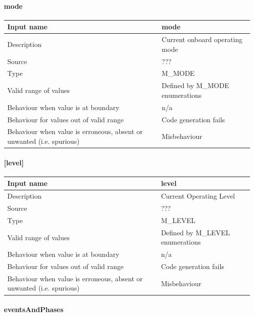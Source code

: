 \paragraph{mode}

\begin{longtable}{p{}p{}}
\toprule
Input name				& mode \\
\midrule
Description				& Current onboard operating mode \\
\midrule
Source					& ??? \\ 
\midrule
Type					& M\_MODE \\
\midrule
Valid range of values	& Defined by M\_MODE enumerations \\
\midrule
Behaviour when value is at boundary	& n/a \\
\midrule
Behaviour for values out of valid range	& Code generation fails \\
\midrule
Behaviour when value is erroneous, absent or unwanted (i.e. spurious) & Misbehaviour \\
\bottomrule
\end{longtable}


\paragraph{[level]}

\begin{longtable}{p{}p{}}
\toprule
Input name				& level \\
\midrule
Description				& Current Operating Level \\
\midrule
Source					& ??? \\ 
\midrule
Type					& M\_LEVEL \\
\midrule
Valid range of values	& Defined by M\_LEVEL enumerations \\
\midrule
Behaviour when value is at boundary	& n/a \\
\midrule
Behaviour for values out of valid range	&  Code generation fails \\
\midrule
Behaviour when value is erroneous, absent or unwanted (i.e. spurious) & Misbehaviour \\
\bottomrule
\end{longtable}

\paragraph{eventsAndPhases}

